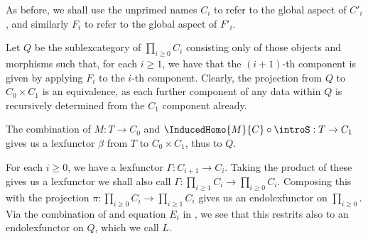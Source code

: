 As before, we shall use the unprimed names $C_i$ to refer to the global aspect of $C'_i$, and similarly $F_i$ to refer to the global aspect of $F'_i$.

Let $Q$ be the sublexcategory of $\prod_{i \geq 0} C_i$ consisting only of those objects and morphisms such that, for each $i \geq 1$, we have that the $(i + 1)$-th component is given by applying $F_i$ to the $i$-th component. Clearly, the projection from $Q$ to $C_0 \times C_1$ is an equivalence, as each further component of any data within $Q$ is recursively determined from the $C_1$ component already.

The combination of $M : T \to C_0$ and $\InducedHomo{M}{C} \circ \introS : T \to C_1$ gives us a lexfunctor $\beta$ from $T$ to $C_0 \times C_1$, thus to $Q$.

For each $i \geq 0$, we have a lexfunctor $\Gamma : C_{i + 1} \to C_{i }$. Taking the product of these gives us a lexfunctor we shall also call $\Gamma : \prod_{i \geq 1} C_i \to \prod_{i \geq 0} C_i$. Composing this with the projection $\pi : \prod_{i \geq 0} C_i \to \prod_{i \geq 1} C_i$ gives us an endolexfunctor on $\prod_{i \geq 0}$. Via the combination of  and equation $E_i$ in , we see that this restrits also to an endolexfunctor on $Q$, which we call $L$.


